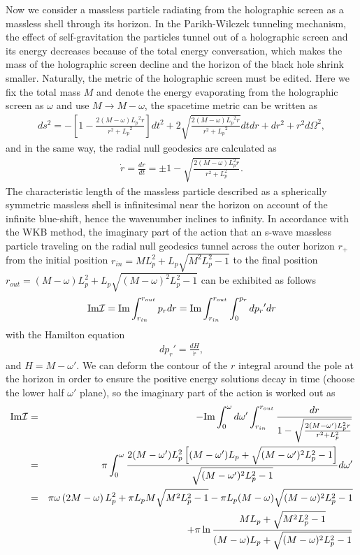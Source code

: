 \documentclass[12pt]{article}
\begin{document}
Now we consider a massless particle radiating from the holographic screen as a massless shell through its horizon.
In the Parikh-Wilczek tunneling mechanism, the effect of self-gravitation the particles tunnel out of a holographic screen and its
energy decreases because of the total energy conversation, which makes the mass of the holographic screen decline and the horizon of the black hole shrink smaller. Naturally, the metric of the holographic screen must be edited. Here we fix the total mass $M$ and denote the energy evaporating from the holographic screen as $\omega$ and use $M \rightarrow M-\omega$, the spacetime metric can be written as
\begin{eqnarray}
ds^2 = - \left[1 - \frac{2 (M-\omega) {L_p}^2 r}{r^2+{L_p}^2} \right] dt^2 + 2 \sqrt{\frac{2 (M- \omega) {L_p}^2 r}{r^2+{L_p}^2}}dtdr + dr^2 +r^2 d\Omega^2,
\end{eqnarray}
and in the same way, the radial null geodesics are calculated as
\begin{eqnarray}
\dot{r} = \frac{dr}{dt}= \pm 1 - \sqrt{ \frac{2 (M - \omega) L_p^2 r}{r^2+L_p^2} }.
\end{eqnarray}
The characteristic length of  the massless particle  described as a spherically symmetric massless shell  is infinitesimal near the horizon on account of the infinite blue-shift, hence the wavenumber inclines to infinity.
In accordance with the WKB method, the imaginary part of the action that an s-wave massless particle  traveling on the radial null geodesics tunnel across the outer horizon $r_+$ from  the initial  position $r_{in} = M L_p^2 + L_p \sqrt{M^2 L_p^2 - 1}$ to  the final position $r_{out}=(M- \omega) L_p^2 + L_p \sqrt{(M-\omega)^2 L_p^2 - 1}$ can be exhibited as follows
\begin{eqnarray}
{\rm Im}{\cal I} = {\rm Im} \int_{r_{in}}^{r_{out}} p_r dr
 = {\rm Im} \int_{r_{in}}^{r_{out}} \int_{0}^{p_r} d{p_r}' dr
\end{eqnarray}
with the Hamilton equation
\begin{eqnarray}
d{p_r}' = \frac{dH}{\dot{r}},
\end{eqnarray}
and $H= M-\omega'$. We can deform the contour of the $r$ integral around the pole at the horizon in order to ensure the positive energy solutions decay in time (choose the lower half $\omega'$  plane), so the imaginary part of the action is worked out as
\begin{eqnarray}
{\rm Im}{\cal I} &=& - {\rm Im} \int_{0}^{\omega}d\omega' \int_{r_{in}}^{r_{out}} \frac{dr}{1-\sqrt{\frac{2 (M -\omega') L_p^2 r}{r^2+L_p^2}}}    \nonumber\\
&=& \pi \int_{0}^{\omega} \frac{  2(M-\omega') L_p^2 \left[(M-\omega') L_p + \sqrt{(M-\omega')^2 L_p^2 - 1}\right]  }{\sqrt{(M-\omega')^2 L_p^2 - 1}  }d\omega'    \nonumber  \\
&=&  \pi \omega \left(2M - \omega \right)L_p^2 + \pi L_p M \sqrt{M^2 L_p^2 -1} -\pi L_p (M-\omega) \sqrt{(M - \omega)^2 L_p^2 -1}  \nonumber \\
& &+  \pi \ln {\frac{M L_p + \sqrt{M^2 L_p^2 -1}}{(M - \omega)L_p + \sqrt{(M - \omega)^2 L_p^2 -1 }}}
\end{eqnarray}
\end{document}
